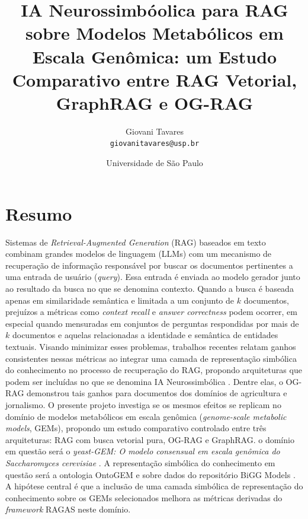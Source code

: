 \documentclass{article}
\title{IA Neurossimbóolica para RAG sobre Modelos Metabólicos em Escala
	Genômica: um Estudo Comparativo entre RAG Vetorial, GraphRAG e
	OG-RAG} %
\author{Giovani Tavares\\ \texttt{giovanitavares@usp.br}} %
\date{Universidade de São Paulo} %
\begin{document}
\maketitle %






\section{Resumo}

Sistemas de \textit{Retrieval-Augmented Generation} (RAG) baseados em texto combinam grandes modelos de linguagem (LLMs) com um mecanismo de recuperação de informação responsável por buscar os documentos pertinentes a uma entrada de usuário (\textit{query}). Essa entrada é enviada ao modelo gerador junto ao resultado da busca no que se denomina contexto. Quando a busca é baseada apenas em similaridade semântica e limitada a um conjunto de $k$ documentos, prejuízos a métricas como \textit{context recall} e \textit{answer correctness} podem ocorrer, em especial quando mensuradas em conjuntos de perguntas respondidas por mais de $k$ documentos e aquelas relacionadas a identidade e semântica de entidades textuais. Visando minimizar esses problemas, trabalhos recentes relatam ganhos consistentes nessas métricas ao integrar uma camada de representação simbólica do conhecimento no processo de recuperação do RAG, propondo arquiteturas que podem ser incluídas no que se denomina IA Neurossimbólica \cite{shakarian2023neurosymbolic}. Dentre elas,  o OG-RAG \cite{sharma2025ograg} demonstrou tais ganhos para documentos dos domínios de agricultura e jornalismo. O presente projeto investiga se os mesmos efeitos se replicam no domínio de modelos metabólicos em escala genômica (\textit{genome-scale metabolic models}, GEMs), propondo um estudo comparativo controlado entre três arquiteturas: RAG com busca vetorial pura, OG-RAG e GraphRAG. o domínio em questão será o \textit{yeast-GEM: O modelo consensual em escala genômica do Saccharomyces cerevisiae} \cite{zhang2024yeast9}. A representação simbólica do conhecimento em questão será a ontologia OntoGEM \cite{souza2025ontogem} e sobre dados do repositório BiGG Models \cite{king2016bigg}. A hipótese central é que a inclusão de uma camada simbólica de representação do conhecimento sobre os GEMs selecionados melhora as métricas derivadas do \textit{framework} RAGAS \cite{ragas2024docs} neste domínio. 
\end{document}
